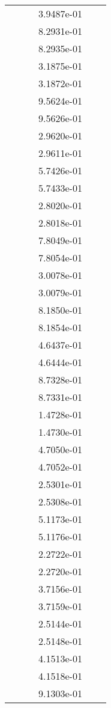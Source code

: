\begin{xltabular}{\textwidth}{r|rS[table-format=1.3e+2]S[table-format=1.4e+2]S[table-format=1.4e+2]S[table-format=-1.5]}
&  &  & 3.9487e-01 & & \\
&  &  & 8.2931e-01 & & \\
&  &  & 8.2935e-01 & & \\
&  &  & 3.1875e-01 & & \\
&  &  & 3.1872e-01 & & \\
&  &  & 9.5624e-01 & & \\
&  &  & 9.5626e-01 & & \\
&  &  & 2.9620e-01 & & \\
&  &  & 2.9611e-01 & & \\
&  &  & 5.7426e-01 & & \\
&  &  & 5.7433e-01 & & \\
&  &  & 2.8020e-01 & & \\
&  &  & 2.8018e-01 & & \\
&  &  & 7.8049e-01 & & \\
&  &  & 7.8054e-01 & & \\
&  &  & 3.0078e-01 & & \\
&  &  & 3.0079e-01 & & \\
&  &  & 8.1850e-01 & & \\
&  &  & 8.1854e-01 & & \\
&  &  & 4.6437e-01 & & \\
&  &  & 4.6444e-01 & & \\
&  &  & 8.7328e-01 & & \\
&  &  & 8.7331e-01 & & \\
&  &  & 1.4728e-01 & & \\
&  &  & 1.4730e-01 & & \\
&  &  & 4.7050e-01 & & \\
&  &  & 4.7052e-01 & & \\
&  &  & 2.5301e-01 & & \\
&  &  & 2.5308e-01 & & \\
&  &  & 5.1173e-01 & & \\
&  &  & 5.1176e-01 & & \\
&  &  & 2.2722e-01 & & \\
&  &  & 2.2720e-01 & & \\
&  &  & 3.7156e-01 & & \\
&  &  & 3.7159e-01 & & \\
&  &  & 2.5144e-01 & & \\
&  &  & 2.5148e-01 & & \\
&  &  & 4.1513e-01 & & \\
&  &  & 4.1518e-01 & & \\
&  &  & 9.1303e-01 & & \\

\end{xltabular}
